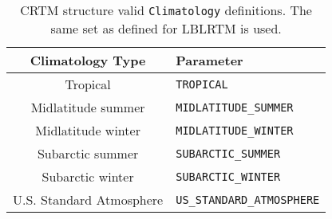 \begin{table}[htp]
  \centering
  \begin{tabular}{c l}
    \hline
    \sffamily\textbf{Climatology Type} & \sffamily\textbf{Parameter} \\
    \hline\hline
             Tropical          &  \texttt{TROPICAL}\\              
        Midlatitude summer     &  \texttt{MIDLATITUDE\_SUMMER}\\
        Midlatitude winter     &  \texttt{MIDLATITUDE\_WINTER}\\
         Subarctic summer      &  \texttt{SUBARCTIC\_SUMMER}\\
         Subarctic winter      &  \texttt{SUBARCTIC\_WINTER}\\
     U.S. Standard Atmosphere  &  \texttt{US\_STANDARD\_ATMOSPHERE}\\
    \hline 
  \end{tabular}
  \caption{CRTM \Atmosphere{} structure valid \texttt{Climatology} definitions. The same set as defined for LBLRTM is used.}
  \label{tab:climatology}
\end{table}

